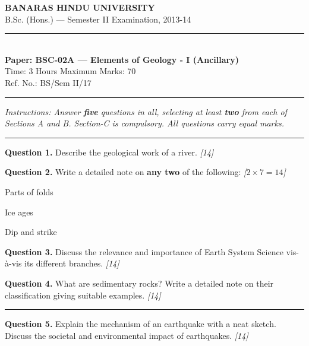 \documentclass[11pt,a4paper]{article}
\newcommand{\pts}[1]{\hfill   \textit{[#1]}}
\begin{document}
\begin{center}
  {\large\bfseries BANARAS HINDU UNIVERSITY}\\[2pt]
  {\normalsize B.Sc. (Hons.) --- Semester II Examination, 2013-14}\\[6pt]
  \rule{0.8\linewidth}{0.5pt}\\[6pt]
  {\large\bfseries Paper: BSC-02A --- Elements of Geology - I (Ancillary)}\\[4pt]
  {\normalsize Time: 3 Hours \hfill Maximum Marks: 70}\\[2pt]
  {\small Ref. No.: BS/Sem II/17}
\end{center}
\rule{\linewidth}{0.4pt}
\smallskip



\noindent   \textit{Instructions: Answer   \textbf{five} questions in all, selecting at least   \textbf{two} from each of Sections A and B. Section-C is compulsory. All questions carry equal marks.}
\bigskip

\bigskip


\rule{\linewidth}{0.4pt}\smallskip




\noindent   \textbf{Question 1.} Describe the geological work of a river. \pts{14}

\medskip


\noindent   \textbf{Question 2.} Write a detailed note on   \textbf{any two} of the following: \pts{$2  \times 7 = 14$}

\begin{parts}
  \item Parts of folds
  \item Ice ages
  \item Dip and strike
\end{parts}

\medskip


\noindent   \textbf{Question 3.} Discuss the relevance and importance of Earth System Science vis-à-vis its different branches. \pts{14}

\medskip


\noindent   \textbf{Question 4.} What are sedimentary rocks? Write a detailed note on their classification giving suitable examples. \pts{14}

\bigskip


\rule{\linewidth}{0.4pt}\smallskip




\noindent   \textbf{Question 5.} Explain the mechanism of an earthquake with a neat sketch. Discuss the societal and environmental impact of earthquakes. \pts{14}
\end{document}
